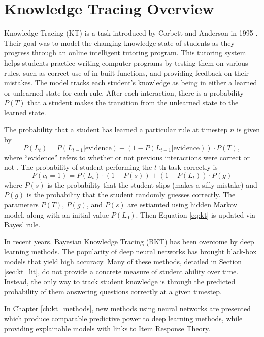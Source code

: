 \section*{Knowledge Tracing Overview}
Knowledge Tracing (KT) is a task introduced by Corbett and Anderson in 1995 \cite{corbett1995}. Their goal was to model the changing knowledge state of students as they progress through an online intelligent tutoring program. This tutoring system helps students practice writing computer programs by testing them on various rules, such as correct use of in-built functions, and providing feedback on their mistakes. The model tracks each student's knowledge as being in either a learned or unlearned state for each rule. After each interaction, there is a probability $P(T)$ that a student makes the transition from the unlearned state to the learned state.

The probability that a student has learned a particular rule at timestep $n$ is given by
\begin{equation}
  P(L_t) = P(L_{t-1} | \text{evidence}) + (1 - P(L_{t-1} | \text{evidence})) \cdot P(T),
\label{eq:kt}
\end{equation}
where ``evidence'' refers to whether or not previous interactions were correct or not \cite{corbett1995}. The probability of student performing the $t$-th task correctly is 
\begin{equation}
  P(c_t = 1) = P(L_t) \cdot (1 - P(s)) + (1 - P(L_t))\cdot P(g)
  \label{eq:kt_prob_correct}
\end{equation}
where $P(s)$ is the probability that the student slips (makes a silly mistake) and $P(g)$ is the probability that the student randomly guesses correctly. The parameters $P(T)$, $P(g)$, and $P(s)$ are estiamted using hidden Markov model, along with an initial value $P(L_0)$. Then Equation \ref{eq:kt} is updated via Bayes' rule.

In recent years, Bayesian Knowledge Tracing (BKT) has been overcome by deep learning methods. The popularity of deep neural networks has brought black-box models that yield high accuracy. Many of these methods, detailed in Section \ref{sec:kt_lit}, do not provide a concrete measure of student ability over time. Instead, the only way to track student knowledge is through the predicted probability of them answering questions correctly at a given timestep. 

In Chapter \ref{ch:kt_methods}, new methods using neural networks are presented which produce comparable predictive power to deep learning methods, while providing explainable models with links to Item Response Theory.


